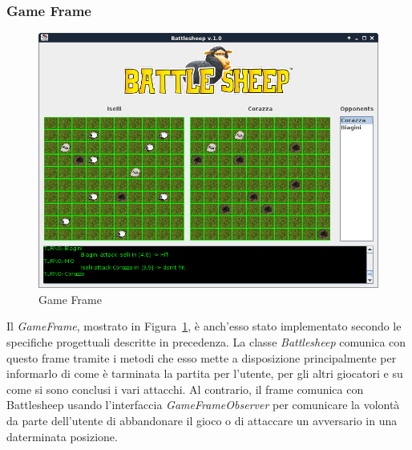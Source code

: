 \subsubsection{Game Frame}
\begin{figure}[!h]
	\centering
	\includegraphics[scale=0.4]{core/imgs/gui/game_frame}
	\caption{Game Frame}
	\label{figure:game_frame}
\end{figure}
Il \textit{GameFrame}, mostrato in Figura~\ref{figure:game_frame}, è anch'esso
stato implementato secondo le specifiche progettuali descritte in precedenza.\newline
La classe \textit{Battlesheep} comunica con questo frame tramite i metodi che
esso mette a disposizione principalmente per informarlo di come è tarminata la
partita per l'utente, per gli altri giocatori e su come si sono conclusi i vari
attacchi. Al contrario, il frame comunica con Battlesheep usando l'interfaccia
\textit{GameFrameObserver} per comunicare la volontà da parte dell'utente di
abbandonare il gioco o di attaccare un avversario in una daterminata posizione.
